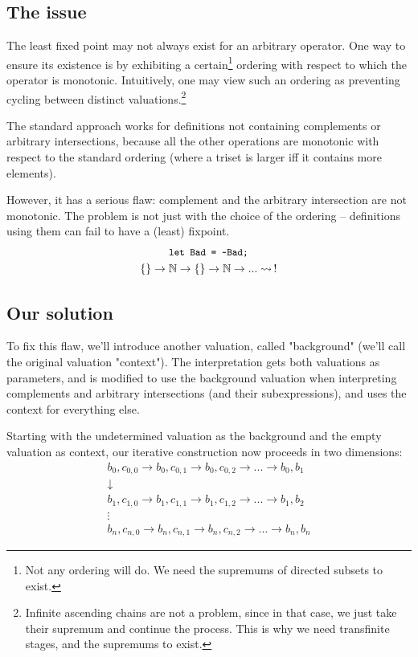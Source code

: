 \documentclass[oneside,12pt]{book}
\theoremstyle{definition}
\theoremstyle{remark}
\newcommand{\tde}{\raisebox{0.5ex}{\texttildelow}}
\begin{document}
\subsection{The issue}
The least fixed point may not always exist for an arbitrary operator. One way
to ensure its existence is by exhibiting a certain\footnote{Not any
ordering will do. We need the supremums of directed subsets to exist.} ordering
with respect to which the operator is monotonic.
Intuitively, one may view such an ordering as preventing cycling between distinct
valuations.\footnote{Infinite ascending chains are not a problem, since in that case,
we just take their supremum and continue the process. This is why we need
transfinite stages, and the supremums to exist.}

The standard approach works for definitions not containing complements
or arbitrary intersections, because all the other operations are monotonic
with respect to the standard ordering (where a triset is larger iff it contains
more elements).

However, it has a serious flaw: complement and the arbitrary
intersection are not monotonic. The problem is not just with the choice
of the ordering -- definitions using them can fail to have a (least) fixpoint.
\begin{gather*}
  \texttt{\small let Bad = \tde Bad;} \\
  \{\} \rightarrow \mathbb{N} \rightarrow \{\} \rightarrow \mathbb{N}
    \rightarrow ... \rightsquigarrow~\!!
\end{gather*}


\subsection{Our solution}
To fix this flaw, we'll introduce another valuation, called "background"
(we'll call the original valuation "context"). The interpretation gets both
valuations as parameters, and is modified to use the background valuation when
interpreting complements and arbitrary intersections (and their subexpressions),
and uses the context for everything else.

Starting with the undetermined valuation as the background and the empty valuation
as context, our iterative construction now proceeds in two dimensions:
\begin{gather*}
  b_0, c_{0,0} \rightarrow b_0, c_{0,1} \rightarrow b_0, c_{0,2}
    \rightarrow ... \rightarrow b_0, b_1 \\
  \downarrow \\
  b_1, c_{1,0} \rightarrow b_1, c_{1,1} \rightarrow b_1, c_{1,2}
    \rightarrow ... \rightarrow b_1, b_2 \\
  \vdots \\
  b_n, c_{n,0} \rightarrow b_n, c_{n,1} \rightarrow b_n, c_{n,2}
    \rightarrow ... \rightarrow b_n, b_n
\end{gather*}
\end{document}
